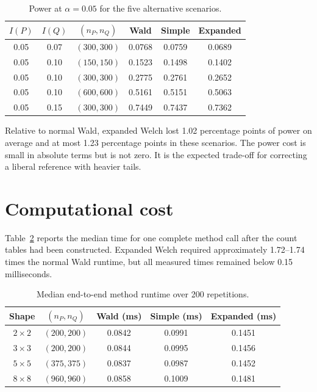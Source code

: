 \begin{table}[htbp]
\centering
\caption{Power at \(\alpha=0.05\) for the five alternative scenarios.}
\label{tab:power-results}
\begin{tabular}{@{}cccccc@{}}
\toprule
\(I(P)\) & \(I(Q)\) & \((n_P,n_Q)\) & Wald & Simple & Expanded \\
\midrule
0.05 & 0.07 & \((300,300)\) & 0.0768 & 0.0759 & 0.0689 \\
0.05 & 0.10 & \((150,150)\) & 0.1523 & 0.1498 & 0.1402 \\
0.05 & 0.10 & \((300,300)\) & 0.2775 & 0.2761 & 0.2652 \\
0.05 & 0.10 & \((600,600)\) & 0.5161 & 0.5151 & 0.5063 \\
0.05 & 0.15 & \((300,300)\) & 0.7449 & 0.7437 & 0.7362 \\
\bottomrule
\end{tabular}
\end{table}

Relative to normal Wald, expanded Welch lost 1.02 percentage points of power
on average and at most 1.23 percentage points in these scenarios. The power
cost is small in absolute terms but is not zero. It is the expected trade-off
for correcting a liberal reference with heavier tails.

\section{Computational cost}

Table~\ref{tab:runtime-results} reports the median time for one complete method
call after the count tables had been constructed. Expanded Welch required
approximately 1.72--1.74 times the normal Wald runtime, but all measured times
remained below 0.15 milliseconds.

\begin{table}[htbp]
\centering
\caption{Median end-to-end method runtime over 200 repetitions.}
\label{tab:runtime-results}
\begin{tabular}{@{}ccccc@{}}
\toprule
Shape & \((n_P,n_Q)\) & Wald (ms) & Simple (ms) & Expanded (ms) \\
\midrule
\(2\times2\) & \((200,200)\) & 0.0842 & 0.0991 & 0.1451 \\
\(3\times3\) & \((200,200)\) & 0.0844 & 0.0995 & 0.1456 \\
\(5\times5\) & \((375,375)\) & 0.0837 & 0.0987 & 0.1452 \\
\(8\times8\) & \((960,960)\) & 0.0858 & 0.1009 & 0.1481 \\
\bottomrule
\end{tabular}
\end{table}


